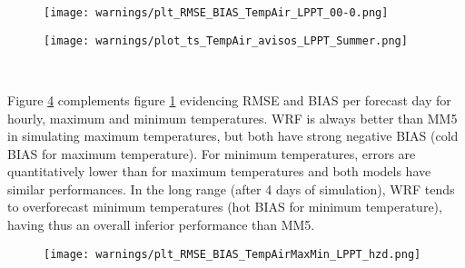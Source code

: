 \begin{figure}[!htp]
    \centering
    \texttt{[image: warnings/plt\_RMSE\_BIAS\_TempAir\_LPPT\_00-0.png]}
    \label{fig:t2m_rmse_bias_hz}
\end{figure}
\FloatBarrier

\begin{figure}[!htp]
\centering
\texttt{[image: warnings/plot\_ts\_TempAir\_avisos\_LPPT\_Summer.png]}
\label{fig:t2m_heat_wave_ts}
\end{figure}
\FloatBarrier

\begin{figure}[!htp]
    \centering
    \\
\label{fig:t2m_lst}
\end{figure}
\FloatBarrier

Figure \ref{fig:t2m_hzd} complements figure \ref{fig:t2m_rmse_bias_hz} evidencing RMSE and BIAS per forecast day for hourly, maximum and minimum temperatures. WRF is always better than MM5 in simulating maximum temperatures, but both have strong negative BIAS (cold BIAS for maximum temperature). For minimum temperatures, errors are quantitatively lower than for maximum temperatures and both models have similar performances. In the long range (after 4 days of simulation), WRF tends to overforecast minimum temperatures (hot BIAS for minimum temperature), having thus an overall inferior performance than MM5.


\begin{figure}[!htp]
    \centering
    \texttt{[image: warnings/plt\_RMSE\_BIAS\_TempAirMaxMin\_LPPT\_hzd.png]}
    \label{fig:t2m_hzd}
\end{figure}
\FloatBarrier


